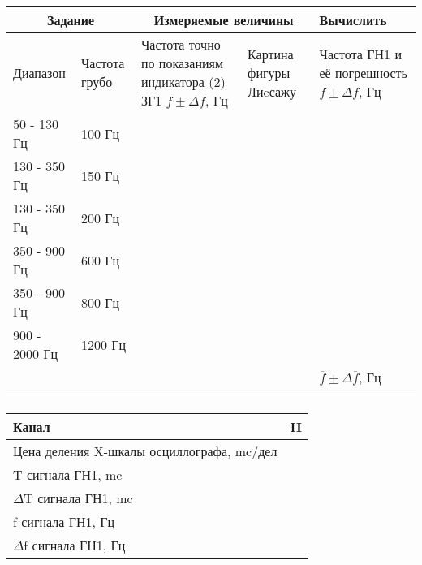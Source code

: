 \documentclass[a4paper,12pt]{article}
\begin{document}
\begin{table}[h]
	\caption{}
	\begin{tabularx}{\textwidth}{|X|X|X|X|X|}
		\hline
		\multicolumn{2}{|c|}{Задание} & 		\multicolumn{2}{|c|}{Измеряемые величины} & Вычислить \\ \hline
		Диапазон & Частота грубо & Частота точно по показаниям индикатора (2) ЗГ1 $f \pm \Delta f$, Гц & Картина фигуры Лиcсажу & Частота ГН1 и её погрешность $f \pm \Delta f$, Гц \\ \hline
		50 - 130 Гц & 100 Гц & & & \\ \hline
		130 - 350 Гц & 150 Гц & & & \\ \hline
		130 - 350 Гц & 200 Гц & & & \\ \hline
		350 - 900 Гц & 600 Гц & & & \\ \hline
		350 - 900 Гц & 800 Гц & & & \\ \hline
		900 - 2000 Гц & 1200 Гц & & & \\ \hline
		& & & & $\overline{f} \pm \Delta \overline{f}$, Гц \\ \hline 
	\end{tabularx}
\end{table}

\begin{table}[h]
	\caption{}
	\begin{tabularx}{\textwidth}{|X|X|}
		\hline 
		Канал & II \\ 
		\hline 
		Цена деления X-шкалы осциллографа, mc/дел &  \\ 
		\hline 
		T сигнала ГН1, mc &  \\ 
		\hline 
		$\Delta$T сигнала ГН1, mc &  \\ 
		\hline 
		f сигнала ГН1, Гц &  \\ 
		\hline 
		$\Delta$f сигнала ГН1, Гц &  \\ 
		\hline 
	\end{tabularx} 
\end{table}
\end{document}
